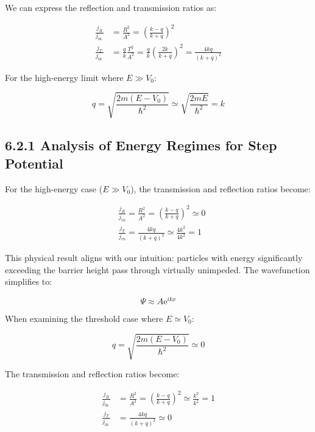 \documentclass[10pt]{article}
\begin{document}
We can express the reflection and transmission ratios as:

\begin{align*}
\frac{j_{R}}{j_{\text {in }}} & =\frac{R^{2}}{A^{2}}=\left(\frac{k-q}{k+q}\right)^{2} \\
\frac{j_{T}}{j_{\text {in }}} & =\frac{q}{k} \frac{T^{2}}{A^{2}}=\frac{q}{k}\left(\frac{2 k}{k+q}\right)^{2}=\frac{4 k q}{(k+q)^{2}} \tag{6.28}
\end{align*}

For the high-energy limit where $E \gg V_{0}$:

\begin{equation*}
q=\sqrt{\frac{2 m\left(E-V_{0}\right)}{\hbar^{2}}} \simeq \sqrt{\frac{2 m E}{\hbar^{2}}}=k \tag{6.29}
\end{equation*}


\subsection*{6.2.1 Analysis of Energy Regimes for Step Potential}

For the high-energy case ($E \gg V_{0}$), the transmission and reflection ratios become:

\begin{align*}
& \frac{j_{R}}{j_{i n}}=\frac{R^{2}}{A^{2}}=\left(\frac{k-q}{k+q}\right)^{2} \simeq 0  \tag{6.30}\\
& \frac{j_{T}}{j_{i n}}=\frac{4 k q}{(k+q)^{2}} \simeq \frac{4 k^{2}}{4 k^{2}}=1
\end{align*}

This physical result aligns with our intuition: particles with energy significantly exceeding the barrier height pass through virtually unimpeded. The wavefunction simplifies to:

\begin{equation*}
\Psi \approx A \mathrm{e}^{i k x} \tag{6.31}
\end{equation*}

When examining the threshold case where $E \simeq V_{0}$:

\begin{equation*}
q=\sqrt{\frac{2 m\left(E-V_{0}\right)}{\hbar^{2}}} \simeq 0 \tag{6.32}
\end{equation*}

The transmission and reflection ratios become:

\begin{align*}
\frac{j_{R}}{j_{\text {in }}} & =\frac{R^{2}}{A^{2}}=\left(\frac{k-q}{k+q}\right)^{2} \simeq \frac{k^{2}}{k^{2}}=1  \tag{6.33}\\
\frac{j_{T}}{j_{\text {in }}} & =\frac{4 k q}{(k+q)^{2}} \simeq 0
\end{align*}
\end{document}
